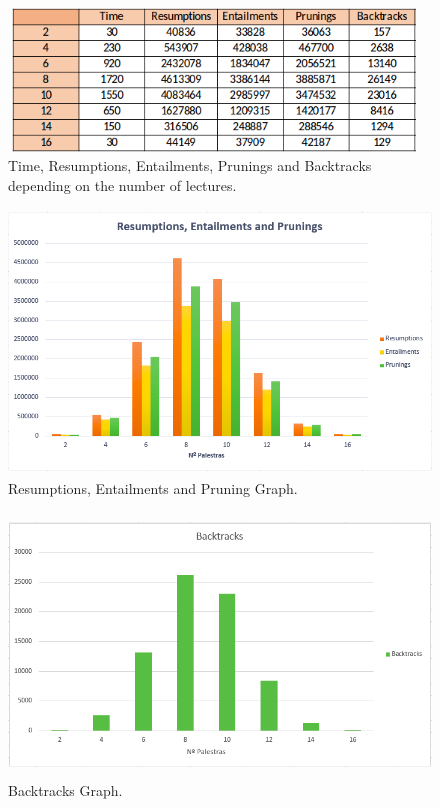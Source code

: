 \documentclass[runningheads,a4paper]{llncs}
\begin{document}
\begin{figure}[!ht]
\centering
\includegraphics[width=10.9cm,height=3.8cm]{Table1}
\caption{Time, Resumptions, Entailments, Prunings and Backtracks depending on the number of lectures.}
\label{fig:Table1}
\end{figure}

\begin{figure}[!ht]
\centering
\includegraphics[width=11.5cm,height=7cm]{Graph1}
\caption{Resumptions, Entailments and Pruning Graph.}
\label{fig:Graph1}
\end{figure}

\begin{figure}[!ht]
\centering
\includegraphics[width=11.5cm,height=7cm]{Backtracks}
\caption{Backtracks Graph.}
\label{fig:Backtracks}
\end{figure}
\end{document}
